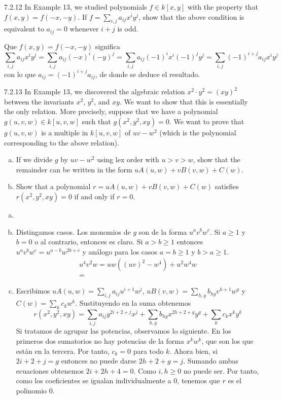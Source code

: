 \documentclass[twoside]{article}
\begin{document}
\begin{ejercicio}{7.2.12}
In Example 13, we studied polynomials $f ∈ k[x, y]$ with the property that $f (x, y) =
f (−x,−y)$. If $f =\sum_{i,j} a_{ij}x^iy^j$, show that the above condition is equivalent to $a_{ij} = 0$
whenever $i + j$ is odd.
\end{ejercicio}
\begin{solucion}
Que $f(x,y)=f(-x,-y)$ significa
\[
\sum_{i,j} a_{ij}x^iy^j=\sum_{i,j} a_{ij}(-x)^i(-y)^j=\sum_{i,j} a_{ij}(-1)^ix^i(-1)^jy^j=\sum_{i,j} (-1)^{i+j}a_{ij}x^iy^j
\]
con lo que $a_{ij}=(-1)^{i+j}a_{ij}$, de donde se deduce el resultado. 
\end{solucion}
\newpage
\begin{ejercicio}{7.2.13}
In Example 13, we discovered the algebraic relation $x^2\cdot y^2 = (xy)^2$ between the invariants
$x^2$, $y^2$, and $xy$. We want to show that this is essentially the only relation. More precisely,
suppose that we have a polynomial $g(u, v, w) ∈ k[u, v, w]$ such that $g(x^2, y^2, xy) = 0$.
We want to prove that $g(u, v, w)$ is a multiple in $k[u, v, w]$ of $uv − w^2$ (which is the
polynomial corresponding to the above relation).
\begin{enumerate}[a.]
\item If we divide $g$ by $uv − w^2$ using lex order with $u > v > w$, show that the remainder
can be written in the form $uA(u, w) + vB(v, w) + C(w)$.
\item Show that a polynomial $r = uA(u, w) + vB(v, w) + C(w)$ satisfies $r(x^2, y^2, xy) = 0$
if and only if $r = 0$.
\end{enumerate}
\end{ejercicio}
\begin{solucion}
\begin{enumerate}[a.]
\item[]
\item Distingamos casos. Los monomios de $g$ son de la forma $u^av^bw^c$. Si $a\geq 1$ y $b=0$ o al contrario, entonces es claro. Si $a> b \geq 1$ entonces $u^av^bw^c = u^{a-b}w^{2b+c}$ y análogo para los casos $a=b\geq 1$ y $b>a\geq 1$.
\begin{gather*}
u^4v^2 w  = uw((uv)^2 - w^4)+ u^2w^4 w\\
= 
\end{gather*}

\item Escribimos $uA(u,w) = \sum_{i,j} a_{ij} u^{i+1}w^j$, $uB(v,w) = \sum_{h,g} b_{hg} v^{h+1}w^g$ y $C(w)=\sum_{k}c_kw^k$. Sustituyendo en la suma obtenemos
$$
r(x^2,y^2,xy) = \sum_{i,j} a_{ij} y^{2i+2+j}x^j + \sum_{h,g} b_{hg} x^{2h+2+g}y^g+ \sum_{k}c_kx^ky^k
$$ 
Si tratamos de agrupar las potencias, observamos lo siguiente. En los primeros dos sumatorios no hay potencias de la forma $x^kw^k$, que son los que están en la tercera. Por tanto, $c_k = 0$ para todo $k$. Ahora bien, si $2i+2+j = g$ entonces no puede darse $2h+2+g=j$. Sumando ambas ecuaciones obtenemos $2i+2h + 4 = 0$. Como $i,h\geq 0$ no puede ser. Por tanto, como los coeficientes se igualan individualmente a $0$, tenemos que $r$ es el polinomio $0$.
\end{enumerate}
\end{solucion}
\end{document}
